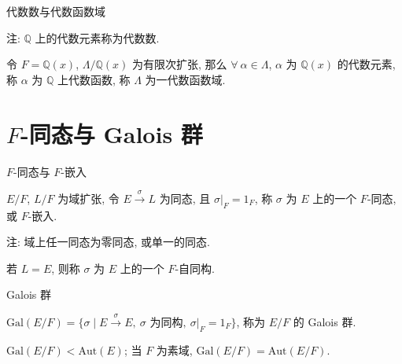 
\begin{frame}{代数数与代数函数域}

注: $\mathbb{Q}$ 上的代数元素称为代数数.

\pause

令 $F = \mathbb{Q}(x)$, $\Lambda/\mathbb{Q}(x)$ 为有限次扩张,
那么 $\forall\ \alpha \in \Lambda$, $\alpha$ 为 $\mathbb{Q}(x)$ 的代数元素,
称 $\alpha$ 为 $\mathbb{Q}$ 上代数函数, 称 $\Lambda$ 为一代数函数域.

\end{frame}


\section[Galois]{$F$-同态与 Galois 群}


\begin{frame}{$F$-同态与 $F$-嵌入}

$E/F$, $L/F$ 为域扩张, 令 $E \xrightarrow{\ \sigma\ } L$ 为同态,
且 $\sigma|_F = 1_F$, 称 $\sigma$ 为 $E$ 上的一个 $F$-同态, 或 $F$-嵌入.

\pause

注: 域上任一同态为零同态, 或单一的同态.

\pause

若 $L = E$, 则称 $\sigma$ 为 $E$ 上的一个 $F$-自同构.

\end{frame}


\begin{frame}{Galois 群}

\begin{Def}[Galois 群]
$\mathrm{Gal}(E/F) = \{ \sigma \mid E \xrightarrow{\ \sigma\ } E,\
\sigma \text{ 为同构},\ \sigma|_F = 1_F \}$, 称为 $E/F$ 的 Galois 群.
\end{Def}

\pause

$\mathrm{Gal}(E/F) < \mathrm{Aut}(E)$;
当 $F$ 为素域, $\mathrm{Gal}(E/F) = \mathrm{Aut}(E/F)$.

\end{frame}


